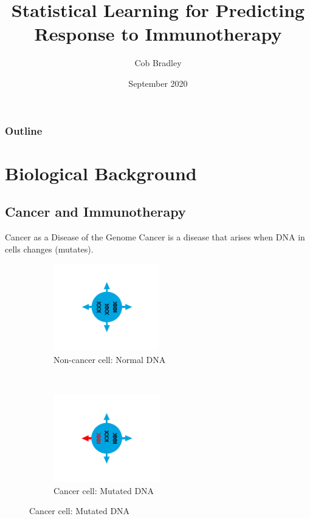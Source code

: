 \documentclass{beamer}
\title{Statistical Learning for Predicting Response to Immunotherapy}
\author{Cob Bradley}
\institute{University of Edinburgh}
\date{September 2020}
\begin{document}
\begin{frame}
\titlepage
\end{frame}
\begin{frame}
\frametitle{Outline}
\tableofcontents
\end{frame}

\section{Biological Background}


\subsection{Cancer and Immunotherapy}
\begin{frame}{Cancer as a Disease of the Genome}
Cancer is a disease that arises when DNA in cells changes (mutates).
\begin{figure}[t!]
    \centering
    \begin{subfigure}[t]{0.45\textwidth}
        \centering
        \includegraphics[height=1.5in]{IC1.png}
        \caption{Non-cancer cell: Normal DNA}
    \end{subfigure}
    ~ 
    \begin{subfigure}[t]{0.45\textwidth}
        \centering
        \includegraphics[height=1.5in]{IC2.png}
        \caption{Cancer cell: Mutated DNA}
    \end{subfigure}
\end{figure}
\end{frame}
\end{document}
